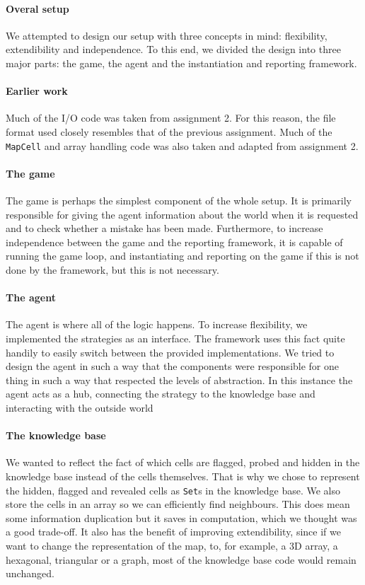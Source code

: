 \documentclass[british]{article}
\newcommand{\code}[1]{\texttt{#1}}
\begin{document}
\paragraph{Overal setup} We attempted to design our setup with three concepts in mind: flexibility, extendibility and independence. To this end, we divided the design into three major parts: the game, the agent and the instantiation and reporting framework.
\paragraph{Earlier work} Much of the I/O code was taken from assignment 2. For this reason, the file format used closely resembles that of the previous assignment. Much of the \code{MapCell} and array handling code was also taken and adapted from assignment 2.
\paragraph{The game} The game is perhaps the simplest component of the whole setup. It is primarily responsible for giving the agent information about the world when it is requested and to check whether a mistake has been made. Furthermore, to increase independence between the game and the reporting framework, it is capable of running the game loop, and instantiating and reporting on the game if this is not done by the framework, but this is not necessary.

\paragraph{The agent} The agent is where all of the logic happens. To increase flexibility, we implemented the strategies as an interface. The framework uses this fact quite handily to easily switch between the provided implementations. We tried to design the agent in such a way that the components were responsible for one thing in such a way that respected the levels of abstraction. In this instance the agent acts as a hub, connecting the strategy to the knowledge base and interacting with the outside world 

\paragraph{The knowledge base} We wanted to reflect the fact of which cells are flagged, probed and hidden in the knowledge base instead of the cells themselves. That is why we chose to represent the hidden, flagged and revealed cells as \code{Set}s in the knowledge base. We also store the cells in an array so we can efficiently find neighbours. This does mean some information duplication but it saves in computation, which we thought was a good trade-off. It also has the benefit of improving extendibility, since if we want to change the representation of the map, to, for example, a 3D array, a hexagonal, triangular or a graph, most of the knowledge base code would remain unchanged. 
\end{document}

